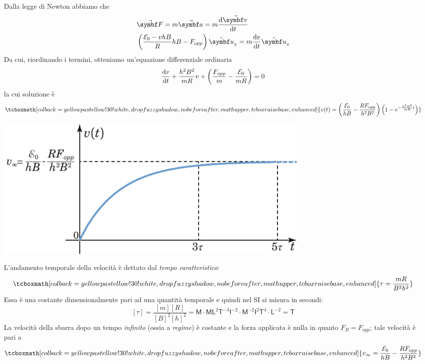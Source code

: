 Dalla legge di Newton abbiamo che
\begin{align*}
	&\vba{F}=m\vba{a}=m\dv{\vba{v}}{t}\\
	&\left(\frac{\mathcal{E}_0-vhB}{R}hB-F_{opp}\right)\vbh{u}_x=m\dv{v}{t}\vbh{u}_x
\end{align*}
Da cui, riordinando i termini, otteniamo un'equazione differenziale ordinaria
\begin{equation*}
	\dv{v}{t}+\frac{h^2B^2}{mR}v+\left(\frac{F_{opp}}{m}-\frac{\mathcal{E}_0}{mR}\right)=0
\end{equation*}
la cui soluzione è
\begin{equation}
	\tcboxmath[colback=yellowpastellow!30!white,drop fuzzy shadow, nobeforeafter, math upper, tcbox raise base, enhanced]{v(t)=\left(\frac{\mathcal{E}_0}{hB}-\frac{R F_{opp}}{h^2B^2}\right)\left(1-e^{-\frac{h^2B^2}{mR}t}\right)}
\end{equation}
\begin{center}
	\includegraphics[width=0.7\textwidth]{images/chp11/chp11velmotoreACgraf.pdf}
\end{center}
L'andamento temporale della velocità è dettato dal \textit{tempo caratteristico}:
\begin{equation}
	\tcboxmath[colback=yellowpastellow!30!white,drop fuzzy shadow, nobeforeafter, math upper, tcbox raise base, enhanced]{\tau=\frac{mR}{B^2h^2}}
\end{equation}
Essa è una costante dimensionalmente pari ad una quantità temporale e quindi nel SI si misura in secondi:
\begin{equation*}
	\left[\tau\right]=\frac{\left[m\right]\left[R\right]}{\left[B\right]^2\left[h\right]^2}=\mathsf{M}\cdot\mathsf{M}\mathsf{L}^2\mathsf{T}^{-3} \mathsf{I}^{-2}\cdot \mathsf{M}^{-2} \mathsf{I}^{2} \mathsf{T}^4\cdot\mathsf{L}^{-2}  =\mathsf{T}
\end{equation*}
La velocità della sbarra dopo un tempo \textit{infinito} (ossia a \textit{regime}) è costante e la forza applicata è nulla in quanto $F_B=F_{opp}$; tale velocità è pari a
\begin{equation}
	\tcboxmath[colback=yellowpastellow!30!white,drop fuzzy shadow, nobeforeafter, math upper, tcbox raise base, enhanced]{v_{\infty}=\frac{\mathcal{E}_0}{hB}-\frac{R F_{opp}}{h^2B^2}}
\end{equation}
